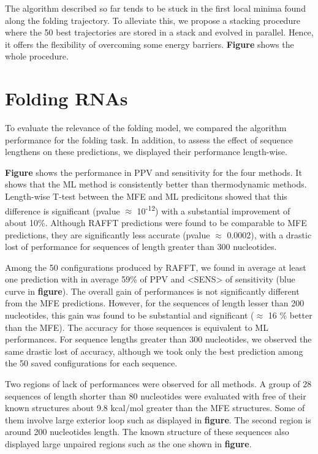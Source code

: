 \documentclass[a4paper,12pt]{article}
\begin{document}
{{The algorithm described so far tends to be stuck in the first local minima found
along the folding trajectory. To alleviate this, we propose a stacking procedure
where the 50 best trajectories are stored in a stack and evolved in parallel.
Hence, it offers the flexibility of overcoming some energy barriers. \textbf{Figure}
shows the whole procedure.

\section{Folding RNAs}
\label{sec:orga1ab6cf}
To evaluate the relevance of the folding model, we compared the algorithm
performance for the folding task. In addition, to assess the effect of sequence
lengthens on these predictions, we displayed their performance length-wise.

\textbf{Figure} shows the performance in PPV and sensitivity for the four methods. It
shows that the ML method is consistently better than thermodynamic methods.
Length-wise T-test between the MFE and ML predicitons showed that this
difference is significant (pvalue \(\approx\) 10\textsuperscript{-12}) with a substantial
improvement of about 10\%. Although RAFFT predictions were found to be comparable
to MFE predictions, they are significantly less accurate (pvalue \(\approx\)
0.0002), with a drastic lost of performance for sequences of length greater than
300 nucleotides.

Among the 50 configurations produced by RAFFT, we found in average at least one
prediction with in average 59\% of PPV and <SENS> of sensitivity (blue curve in
\textbf{figure}). The overall gain of performances is not significantly different from
the MFE predictions. However, for the sequences of length lesser than 200
nucleotides, this gain was found to be substantial and significant (\(\approx\) 16 \%
better than the MFE). The accuracy for those sequences is equivalent to ML
performances. For sequence lengths greater than 300 nucleotides, we observed the
same drastic lost of accuracy, although we took only the best prediction among
the 50 saved configurations for each sequence.

Two regions of lack of performances were observed for all methods. A group of 28
sequences of length shorter than 80 nucleotides were evaluated with free of
their known structures about 9.8 kcal/mol greater than the MFE structures. Some
of them involve large exterior loop such as displayed in \textbf{figure}. The second
region is around 200 nucleotides length. The known structure of these sequences
also displayed large unpaired regions such as the one shown in \textbf{figure}.

}}
\end{document}
